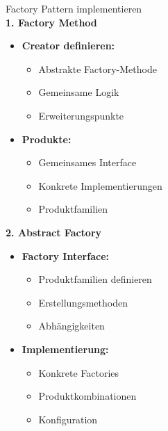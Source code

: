 \begin{KR}{Factory Pattern implementieren}\\
\textbf{1. Factory Method}
\begin{itemize}
    \item \textbf{Creator definieren:}
    \begin{itemize}
        \item Abstrakte Factory-Methode
        \item Gemeinsame Logik
        \item Erweiterungspunkte
    \end{itemize}
    
    \item \textbf{Produkte:}
    \begin{itemize}
        \item Gemeinsames Interface
        \item Konkrete Implementierungen
        \item Produktfamilien
    \end{itemize}
\end{itemize}

\textbf{2. Abstract Factory}
\begin{itemize}
    \item \textbf{Factory Interface:}
    \begin{itemize}
        \item Produktfamilien definieren
        \item Erstellungsmethoden
        \item Abhängigkeiten
    \end{itemize}
    
    \item \textbf{Implementierung:}
    \begin{itemize}
        \item Konkrete Factories
        \item Produktkombinationen
        \item Konfiguration
    \end{itemize}
\end{itemize}
\end{KR}

